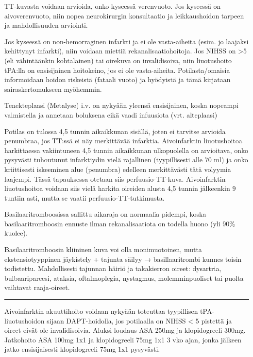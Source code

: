 \documentclass[
]{book}
\begin{document}
TT-kuvasta voidaan arvioida, onko kyseessä verenvuoto. Jos kyseessä on aivoverenvuoto, niin nopea neurokirurgin konsultaatio ja leikkaushoidon tarpeen ja mahdollisuuden arviointi.

Jos kyseessä on non-hemorraginen infarkti ja ei ole vasta-aiheita (esim. jo laajaksi kehittynyt infarkti), niin voidaan miettiä rekanalisaatiohoitoja. Jos NIHSS on \textgreater5 (eli vähintäänkin kohtalainen) tai oirekuva on invalidisoiva, niin liuotushoito tPA:lla on ensisijainen hoitokeino, jos ei ole vasta-aiheita. Potilasta/omaisia informoidaan hoidon riskeistä (fataali vuoto) ja hyödyistä ja tämä kirjataan sairaskertomukseen myöhemmin.

Tenekteplaasi (Metalyse) i.v. on nykyään yleensä ensisijainen, koska nopeampi valmistella ja annetaan boluksena eikä vaadi infuusiota (vrt. alteplaasi)

Potilas on tulossa 4,5 tunnin aikaikkunan sisällä, joten ei tarvitse arvioida penumbraa, jos TT:ssä ei näy merkittävää infarktia. Aivoinfarktin liuotushoitoa harkittaessa vakiintuneen 4,5 tunnin aikaikkunan ulkopuolella on arvioitava, onko pysyvästi tuhoutunut infarktiydin vielä rajallinen (tyypillisesti alle 70 ml) ja onko kriittisesti iskeeminen alue (penumbra) edelleen merkittävästi tätä volyymia laajempi. Tässä tapauksessa otetaan siis perfuusio-TT-kuva. Aivoinfarktin liuotushoitoa voidaan siis vielä harkita oireiden alusta 4,5 tunnin jälkeenkin 9 tuntiin asti, mutta se vaatii perfuusio-TT-tutkimusta.

Basilaaritromboosissa sallittu aikaraja on normaalia pidempi, koska basilaaritromboosin ennuste ilman rekanalisaatiota on todella huono (yli 90\% kuolee).

Basilaaritromboosin kliininen kuva voi olla monimuotoinen, mutta ekstensiotyyppinen jäykistely + tajunta säilyy → basillaaritrombi kunnes toisin todistettu. Mahdollisesti tajunnan häiriö ja takakierron oireet: dysartria, bulbaaripareesi, ataksia, oftalmoplegia, nystagmus, molemminpuoliset tai puolta vaihtavat raaja-oireet.

\begin{center}\rule{0.5\linewidth}{0.5pt}\end{center}

Aivoinfarktin akuuttihoito voidaan nykyään toteuttaa tyypillisen tPA-liuotushoidon sijaan DAPT-hoidolla, jos potilaalla on NIHSS \textless{} 5 pistettä ja oireet eivät ole invalidisoivia. Aluksi loudaus ASA 250mg ja klopidogreeli 300mg. Jatkohoito ASA 100mg 1x1 ja klopidogreeli 75mg 1x1 3 vko ajan, jonka jälkeen jatko ensisijaisesti klopidogreeli 75mg 1x1 pysyvästi.
\end{document}
